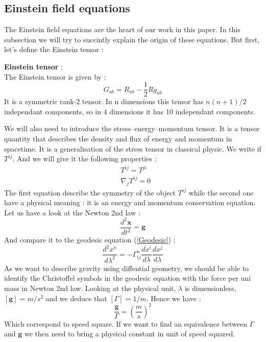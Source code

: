 \documentclass[a4paper,12pt]{article}
\theoremstyle{definition}
\begin{document}
\subsection{Einstein field equations}
The Einstein field equations are the heart of our work in this paper.
In this subsection we will try to succintly explain the origin of these equations.
But first, let's define the Einstein tensor : 
\begin{definition}
	\textbf{Einstein tensor} :\\
	The Einstein tensor is given by :
	\begin{equation}
		G_{ab}=R_{ab}-\frac{1}{2}Rg_{ab}
	\end{equation}
	It is a symmetric rank-2 tensor. In n dimensions this tensor has $n(n+1)/2$ independant components, so in 4 dimensions it has 10 independant components.
\end{definition}
We will also need to introduce the stress–energy–momentum tensor.
It is a tensor quantity that describes the density and flux of energy and momentum in spacetime.
It is a generalisation of the stress tensor in classical physic.
We write if $T^{ij}$.
And we will give it the following properties :
\begin{align}
	&T^{ij}=T^{ji}\\
	&\nabla_j T^{ij}=0\label{conserv}
\end{align}
The first equation describe the symmetry of the object $T^{ij}$ while the second one have a physical meaning : it is an energy and momentum conservation equation.\\
Let us have a look at the Newton 2nd law :
\begin{equation}
	\frac{d^2\boldsymbol{x}}{dt^2}=\boldsymbol{g}
\end{equation}
And compare it to the geodesic equation (\ref{Geodesic}) :
\begin{equation}
	\frac{d^2x^n}{d\lambda^2}=-\Gamma^n_{ij}\frac{dx^i}{d\lambda}\frac{dx^j}{d\lambda}
\end{equation}
As we want to describe gravity using diffential geometry, we should be able to identify the Christoffel symbols in the geodesic equation with the force per uni mass in Newton 2nd law.
Looking at the physical unit, $\lambda$ is dimensionless, $[\boldsymbol{g}]=m/s^2$ and we deduce that $[\Gamma]=1/m$.
Hence we have :
\begin{equation}
	\frac{\boldsymbol{g}}{\Gamma}=(\frac{m}{s})^2
\end{equation}
Which correspond to speed square. If we want to find an equivalence between $\Gamma$ and $\boldsymbol{g}$ we then need to bring a physical constant in unit of speed squared.
\end{document}
